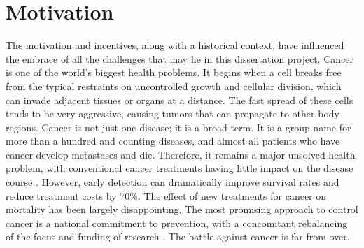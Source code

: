 
\label{chapter:introduction}

\clearpage

\section{Motivation}
\label{section:intro-motivation}

The motivation and incentives, along with a historical context, have influenced the embrace of all the challenges that may lie in this dissertation project. Cancer is one of the world’s biggest health problems. It begins when a cell breaks free from the typical restraints on uncontrolled growth and cellular division, which can invade adjacent tissues or organs at a distance. The fast spread of these cells tends to be very aggressive, causing tumors that can propagate to other body regions. Cancer is not just one disease; it is a broad term. It is a group name for more than a hundred and counting diseases, and almost all patients who have cancer develop metastases and die. Therefore, it remains a major unsolved health problem, with conventional cancer treatments having little impact on the disease course \cite{Li2004}. However, early detection can dramatically improve survival rates and reduce treatment costs by 70\%. The effect of new treatments for cancer on mortality has been largely disappointing. The most promising approach to control cancer is a national commitment to prevention, with a concomitant rebalancing of the focus and funding of research \cite{CancerUndefeated}. The battle against cancer is far from over.

